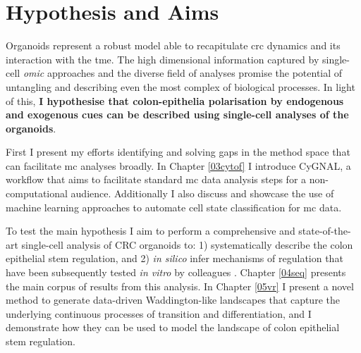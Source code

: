 

\section{Hypothesis and Aims}


Organoids represent a robust model able to recapitulate \acrshort{crc} dynamics and its interaction with the \acrshort{tme}. The high dimensional information captured by single-cell \emph{omic} approaches and the diverse field of analyses promise the potential of untangling and describing even the most complex of biological processes. 
In light of this, \textbf{I hypothesise that colon-epithelia polarisation by endogenous and exogenous cues can be described using single-cell analyses of the organoids}.

First I present my efforts identifying and solving gaps in the method space that can facilitate \acrlong{mc} analyses broadly. In Chapter \ref{03cytof} I introduce CyGNAL, a workflow that aims to facilitate standard \acrshort{mc} data analysis steps for a non-computational audience. Additionally I also discuss and showcase the use of machine learning approaches to automate cell state classification for \acrshort{mc} data.

To test the main hypothesis I aim to perform a comprehensive and state-of-the-art single-cell analysis of CRC organoids to: 1) systematically describe the colon epithelial stem regulation, and 2) \emph{in silico} infer mechanisms of regulation that have been subsequently tested \emph{in vitro} by colleagues \cite{cardoso_rodriguez_single-cell_2023}. 
Chapter \ref{04seq} presents the main corpus of results from this analysis.
In Chapter \ref{05vr} I present a novel method to generate data-driven Waddington-like landscapes that capture the underlying continuous processes of transition and differentiation, and I demonstrate how they can be used to model the landscape of colon epithelial stem regulation.


